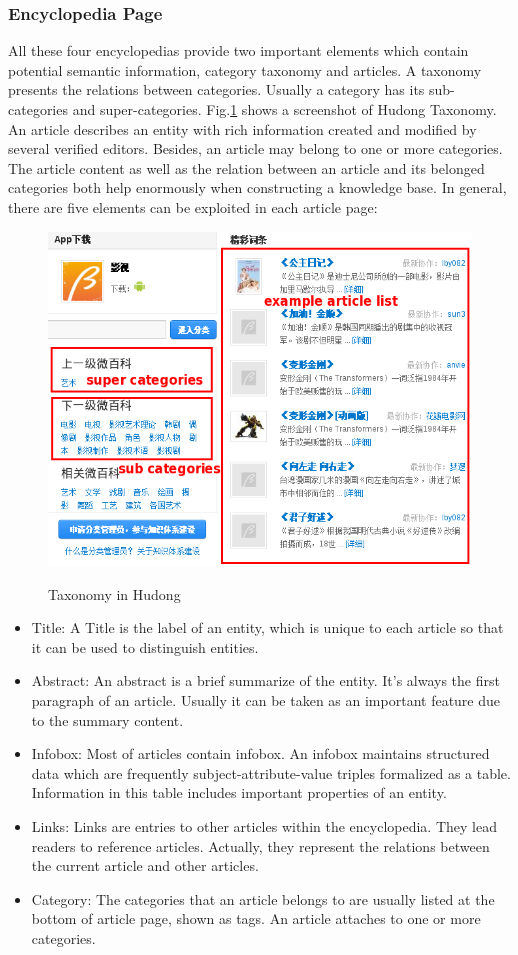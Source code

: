 \documentclass[runningheads,a4paper]{llncs}
\begin{document}
\subsubsection{Encyclopedia Page}
\label{sec:ep}
All these four encyclopedias provide two important elements which contain potential semantic information, category taxonomy and articles. A taxonomy presents the relations between categories. Usually a category has its sub-categories and super-categories. Fig.\ref{fig:hudong-taxonomy} shows a screenshot of Hudong Taxonomy. An article describes an entity with rich information created and modified by several verified editors. Besides, an article may belong to one or more categories. The article content as well as the relation between an article and its belonged categories both help enormously when constructing a knowledge base. In general, there are five elements can be exploited in each article page:
\begin{figure}
    \centering
    \begin{minipage}[t]{0.8\textwidth}
        \centerline{\includegraphics[width=0.8\columnwidth]{fig/hudong-taxonomy2}}
        \label{fig:hudong-taxonomy}
        \caption{Taxonomy in Hudong}
    \end{minipage}%
\end{figure}
\begin{itemize}
  \item Title: A Title is the label of an entity, which is unique to each article so that it can be used to distinguish entities.
  \item Abstract: An abstract is a brief summarize of the entity. It's always the first paragraph of an article. Usually it can be taken as an important feature due to the summary content.
  \item Infobox: Most of articles contain infobox. An infobox maintains structured data which are frequently subject-attribute-value triples formalized as a table. Information in this table includes important properties of an entity.
  \item Links: Links are entries to other articles within the encyclopedia. They lead readers to reference articles. Actually, they represent the relations between the current article and other articles.
  \item Category: The categories that an article belongs to are usually listed at the bottom of article page, shown as tags. An article attaches to one or more categories.
\end{itemize}
\end{document}

